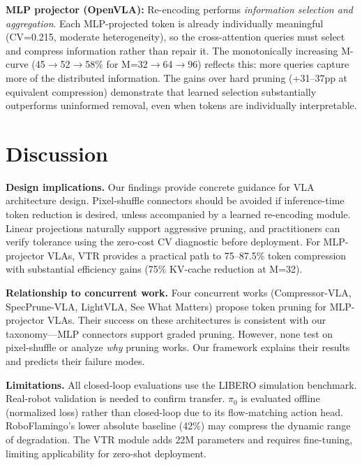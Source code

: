 \documentclass[letterpaper]{article}
\begin{document}
\textbf{MLP projector (OpenVLA):} Re-encoding performs \emph{information selection and aggregation}. Each MLP-projected token is already individually meaningful (CV=0.215, moderate heterogeneity), so the cross-attention queries must select and compress information rather than repair it. The monotonically increasing M-curve (45$\to$52$\to$58\% for M=32$\to$64$\to$96) reflects this: more queries capture more of the distributed information. The gains over hard pruning (+31--37pp at equivalent compression) demonstrate that learned selection substantially outperforms uninformed removal, even when tokens are individually interpretable.

\section{Discussion}

\textbf{Design implications.} Our findings provide concrete guidance for VLA architecture design. Pixel-shuffle connectors should be avoided if inference-time token reduction is desired, unless accompanied by a learned re-encoding module. Linear projections naturally support aggressive pruning, and practitioners can verify tolerance using the zero-cost CV diagnostic before deployment. For MLP-projector VLAs, VTR provides a practical path to 75--87.5\% token compression with substantial efficiency gains (75\% KV-cache reduction at M=32).

\textbf{Relationship to concurrent work.} Four concurrent works (Compressor-VLA, SpecPrune-VLA, LightVLA, See What Matters) propose token pruning for MLP-projector VLAs. Their success on these architectures is consistent with our taxonomy---MLP connectors support graded pruning. However, none test on pixel-shuffle or analyze \emph{why} pruning works. Our framework explains their results and predicts their failure modes.

\textbf{Limitations.} All closed-loop evaluations use the LIBERO simulation benchmark. Real-robot validation is needed to confirm transfer. $\pi_0$ is evaluated offline (normalized loss) rather than closed-loop due to its flow-matching action head. RoboFlamingo's lower absolute baseline (42\%) may compress the dynamic range of degradation. The VTR module adds 22M parameters and requires fine-tuning, limiting applicability for zero-shot deployment.

\end{document}

